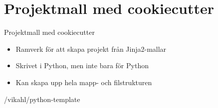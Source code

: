 \section{Projektmall med cookiecutter}

\begin{frame}{Projektmall med cookiecutter}
  \begin{itemize}
    \item Ramverk för att skapa projekt från Jinja2-mallar
    \item Skrivet i Python, men inte bara för Python
    \item Kan skapa upp hela mapp- och filstrukturen
  \end{itemize}

  /vikahl/python-template
\end{frame}
